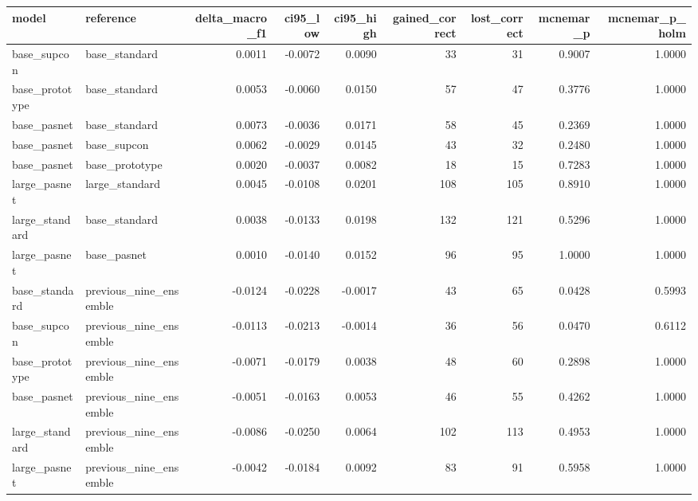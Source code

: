 \begin{tabular}{llrrrrrrr}
\toprule
model & reference & delta\_macro\_f1 & ci95\_low & ci95\_high & gained\_correct & lost\_correct & mcnemar\_p & mcnemar\_p\_holm \\
\midrule
base\_supcon & base\_standard & 0.0011 & -0.0072 & 0.0090 & 33 & 31 & 0.9007 & 1.0000 \\
base\_prototype & base\_standard & 0.0053 & -0.0060 & 0.0150 & 57 & 47 & 0.3776 & 1.0000 \\
base\_pasnet & base\_standard & 0.0073 & -0.0036 & 0.0171 & 58 & 45 & 0.2369 & 1.0000 \\
base\_pasnet & base\_supcon & 0.0062 & -0.0029 & 0.0145 & 43 & 32 & 0.2480 & 1.0000 \\
base\_pasnet & base\_prototype & 0.0020 & -0.0037 & 0.0082 & 18 & 15 & 0.7283 & 1.0000 \\
large\_pasnet & large\_standard & 0.0045 & -0.0108 & 0.0201 & 108 & 105 & 0.8910 & 1.0000 \\
large\_standard & base\_standard & 0.0038 & -0.0133 & 0.0198 & 132 & 121 & 0.5296 & 1.0000 \\
large\_pasnet & base\_pasnet & 0.0010 & -0.0140 & 0.0152 & 96 & 95 & 1.0000 & 1.0000 \\
base\_standard & previous\_nine\_ensemble & -0.0124 & -0.0228 & -0.0017 & 43 & 65 & 0.0428 & 0.5993 \\
base\_supcon & previous\_nine\_ensemble & -0.0113 & -0.0213 & -0.0014 & 36 & 56 & 0.0470 & 0.6112 \\
base\_prototype & previous\_nine\_ensemble & -0.0071 & -0.0179 & 0.0038 & 48 & 60 & 0.2898 & 1.0000 \\
base\_pasnet & previous\_nine\_ensemble & -0.0051 & -0.0163 & 0.0053 & 46 & 55 & 0.4262 & 1.0000 \\
large\_standard & previous\_nine\_ensemble & -0.0086 & -0.0250 & 0.0064 & 102 & 113 & 0.4953 & 1.0000 \\
large\_pasnet & previous\_nine\_ensemble & -0.0042 & -0.0184 & 0.0092 & 83 & 91 & 0.5958 & 1.0000 \\
\bottomrule
\end{tabular}
